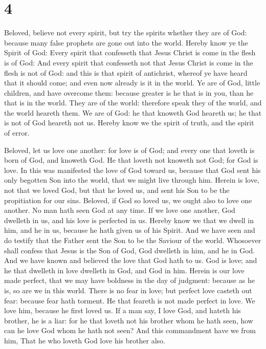 \hypertarget{section-3}{%
\section{4}\label{section-3}}

 Beloved, believe not every spirit, but try the spirits
whether they are of God: because many false prophets are gone out into
the world.  Hereby know ye the Spirit of God: Every spirit
that confesseth that Jesus Christ is come in the flesh is of God:
 And every spirit that confesseth not that Jesus Christ is
come in the flesh is not of God: and this is that spirit of antichrist,
whereof ye have heard that it should come; and even now already is it in
the world.  Ye are of God, little children, and have
overcome them: because greater is he that is in you, than he that is in
the world.  They are of the world: therefore speak they of
the world, and the world heareth them.  We are of God: he
that knoweth God heareth us; he that is not of God heareth not us.
Hereby know we the spirit of truth, and the spirit of error.

 Beloved, let us love one another: for love is of God; and
every one that loveth is born of God, and knoweth God.  He
that loveth not knoweth not God; for God is love.  In this
was manifested the love of God toward us, because that God sent his only
begotten Son into the world, that we might live through him.
 Herein is love, not that we loved God, but that he loved
us, and sent his Son to be the propitiation for our sins.
 Beloved, if God so loved us, we ought also to love one
another.  No man hath seen God at any time. If we love
one another, God dwelleth in us, and his love is perfected in us.
 Hereby know we that we dwell in him, and he in us,
because he hath given us of his Spirit.  And we have seen
and do testify that the Father sent the Son to be the Saviour of the
world.  Whosoever shall confess that Jesus is the Son of
God, God dwelleth in him, and he in God.  And we have
known and believed the love that God hath to us. God is love; and he
that dwelleth in love dwelleth in God, and God in him. 
Herein is our love made perfect, that we may have boldness in the day of
judgment: because as he is, so are we in this world. 
There is no fear in love; but perfect love casteth out fear: because
fear hath torment. He that feareth is not made perfect in love.
 We love him, because he first loved us. 
If a man say, I love God, and hateth his brother, he is a liar: for he
that loveth not his brother whom he hath seen, how can he love God whom
he hath not seen?  And this commandment have we from him,
That he who loveth God love his brother also.

